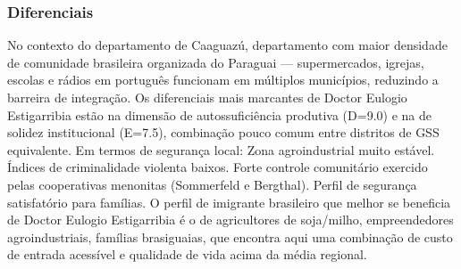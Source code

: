 \subsubsection*{Diferenciais}\label{dif-doctor-eulogio-estigarribia-0506}
No contexto do departamento de Caaguazú, departamento com maior densidade de comunidade brasileira organizada do Paraguai — supermercados, igrejas, escolas e rádios em português funcionam em múltiplos municípios, reduzindo a barreira de integração. Os diferenciais mais marcantes de Doctor Eulogio Estigarribia estão na dimensão de autossuficiência produtiva (D=9.0) e na de solidez institucional (E=7.5), combinação pouco comum entre distritos de GSS equivalente. Em termos de segurança local: Zona agroindustrial muito estável. Índices de criminalidade violenta baixos. Forte controle comunitário exercido pelas cooperativas menonitas (Sommerfeld e Bergthal). Perfil de segurança satisfatório para famílias. O perfil de imigrante brasileiro que melhor se beneficia de Doctor Eulogio Estigarribia é o de agricultores de soja/milho, empreendedores agroindustriais, famílias brasiguaias, que encontra aqui uma combinação de custo de entrada acessível e qualidade de vida acima da média regional.
